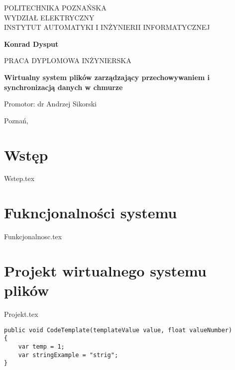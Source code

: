 \documentclass[12pt,a4paper,leqno,oneside,titlepage]{mwrep}
\begin{document}
\begin{titlepage}
\begin{center}
{\large POLITECHNIKA POZNAŃSKA\\ WYDZIAŁ ELEKTRYCZNY\\ INSTYTUT AUTOMATYKI I INŻYNIERII INFORMATYCZNEJ\par}
\end{center}
\vspace{1.5cm plus 1fill}
\begin{center}
{\bf \Large Konrad Dysput\par}
\end{center}
\vspace{1.5cm plus 1mm minus 2mm}
\begin{center}
{\large PRACA DYPLOMOWA INŻYNIERSKA\par}
\end{center}
\vspace{1.5cm plus 1mm minus 2mm}
\begin{center}
{\huge\textbf{Wirtualny system plików zarządzający przechowywaniem i synchronizacją danych w chmurze}\par}
\vspace{1.5cm plus 1.5fill}
\begin{flushright}
{\large Promotor: dr Andrzej Sikorski}
\end{flushright}
\vspace{4cm plus .1fill}
{\large Poznań,\par}
\end{center}
\end{titlepage}

\tableofcontents

\chapter{Wstęp}
{Wstep.tex}

\chapter{Fukncjonalności systemu}
{Funkcjonalnosc.tex}

\chapter{Projekt wirtualnego systemu plików}
{Projekt.tex}

\begin{lstlisting}[caption=Code example]
public void CodeTemplate(templateValue value, float valueNumber)
{
    var temp = 1;
    var stringExample = "strig";
}	
\end{lstlisting}
\end{document}

